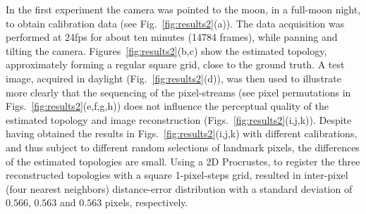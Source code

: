 In the first experiment the camera was pointed to the moon, in a full-moon night, to obtain calibration data (see Fig.~\ref{fig:results2}(a)). The data acquisition was performed at 24fps for about ten minutes (14784 frames), while panning and tilting the camera.
%
Figures~\ref{fig:results2}(b,c) show the estimated topology, approximately forming a regular square grid, close to the ground truth.
%
%
A test image, acquired in daylight (Fig.~\ref{fig:results2}(d)), was then used to illustrate more clearly that the sequencing of the pixel-streams (see pixel permutations in Figs.~\ref{fig:results2}(e,f,g,h)) does not influence the perceptual quality of the estimated topology and image reconstruction (Figs.~\ref{fig:results2}(i,j,k)).
%
Despite having obtained the results in Figs.~\ref{fig:results2}(i,j,k) with different calibrations, and thus subject to different random selections of landmark pixels, the differences of the estimated topologies are small.
Using a 2D Procrustes, to register the three reconstructed topologies with a square 1-pixel-steps grid, resulted in 
inter-pixel (four nearest neighbors) distance-error distribution with a standard deviation of $0.566$, $0.563$ and $0.563$ pixels, respectively. %

%



